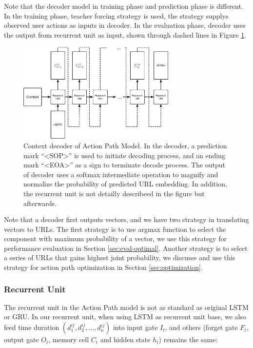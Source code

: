 Note that the decoder model in training phase and prediction phase is different.
In the training phase, teacher forcing strategy \cite{williams1989learning} is used, 
the strategy supplys observed user actions as inputs in decoder.
In the evaluation phase, decoder uses the output from recurrent unit as input, shown through 
dashed lines in Figure \ref{fig:decoder}.

\begin{figure}
    \centering
    \includegraphics[width=0.7\textwidth]{figures/decoder}
    \caption{Context decoder of Action Path Model. In the decoder, 
    a prediction mark ``<SOP>'' is used to initiate decoding process, 
    and an ending mark ``<EOA>'' as a sign to terminate decode process.
    The output of decoder uses a softmax intermediate operation to magnify and normalize
    the probability of predicted URL embedding.
    In addition, the recurrent unit is not detailly describeed in the figure but afterwards.}
    \label{fig:decoder}
\end{figure}

Note that a decoder first outputs vectors, and we have two strategy in translating vectors to URLs. 
The first strategy is to use argmax function to select the component with maximum 
probability of a vector, we use this strategy for performance evaluation in 
Section \ref{sec:eval-optimal}. Another strategy is to select
a series of URLs that gains highest joint probability, 
we discusse and use this strategy for action path optimization in Section \ref{sec:optimization}.

\subsubsection{Recurrent Unit}
\label{sec:recurrent-unit}

The recurrent unit in the Action Path model is not as standard as original 
LSTM or GRU. In our recurrent unit, when using LSTM as recurrent unit base, we also 
feed time duration $(d^{ij}_1, d^{ij}_2, ..., d^{ij}_n)$
into input gate $I_t$, and others (forget gate $F_t$, output gate $O_t$, 
memory cell $C_t$ and hidden state $h_t$) remains the same:

